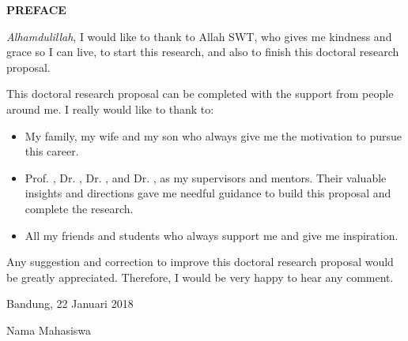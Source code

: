 \begin{center}
\textbf{PREFACE}
\end{center}

\vspace{0.5cm}

\textit{Alhamdulillah}, I would like to thank to Allah SWT, who gives me kindness and grace so I can live, to start 
this research, and also to finish this doctoral research proposal.

This doctoral research proposal can be completed with the support from people around me. I really would like to thank to:
\begin{itemize}
\item My family, my wife and my son who always give me the motivation to pursue this career.
\item Prof. , Dr. , Dr. , and Dr. , as my supervisors 
and mentors. Their valuable insights and directions gave me needful guidance to build this proposal and complete the research.
\item All my friends and students who always support me and give me inspiration. 
\end{itemize}

Any suggestion and correction to improve this doctoral research proposal would be greatly appreciated. 
Therefore, I would be very happy to hear any comment.

\vspace{2cm}
\begin{flushright}
Bandung, 22 Januari 2018

\vspace{1cm}

Nama Mahasiswa
\end{flushright}